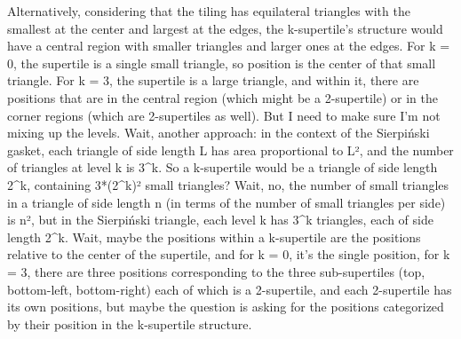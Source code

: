 Alternatively, considering that the tiling has equilateral triangles with the smallest at the center and largest at the edges, the k-supertile's structure would have a central region with smaller triangles and larger ones at the edges. For k = 0, the supertile is a single small triangle, so position is the center of that small triangle. For k = 3, the supertile is a large triangle, and within it, there are positions that are in the central region (which might be a 2-supertile) or in the corner regions (which are 2-supertiles as well). But I need to make sure I'm not mixing up the levels. Wait, another approach: in the context of the Sierpiński gasket, each triangle of side length L has area proportional to L², and the number of triangles at level k is 3^k. So a k-supertile would be a triangle of side length 2^k, containing 3*(2^k)² small triangles? Wait, no, the number of small triangles in a triangle of side length n (in terms of the number of small triangles per side) is n², but in the Sierpiński triangle, each level k has 3^k triangles, each of side length 2^k. Wait, maybe the positions within a k-supertile are the positions relative to the center of the supertile, and for k = 0, it's the single position, for k = 3, there are three positions corresponding to the three sub-supertiles (top, bottom-left, bottom-right) each of which is a 2-supertile, and each 2-supertile has its own positions, but maybe the question is asking for the positions categorized by their position in the k-supertile structure. 


